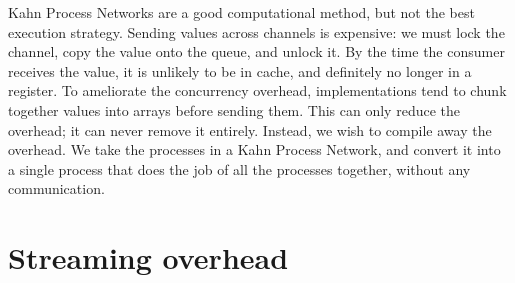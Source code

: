 % 
% 

Kahn Process Networks are a good computational method, but not the best execution strategy.
Sending values across channels is expensive: we must lock the channel, copy the value onto the queue, and unlock it.
By the time the consumer receives the value, it is unlikely to be in cache, and definitely no longer in a register.
To ameliorate the concurrency overhead, implementations tend to chunk together values into arrays before sending them.
This can only reduce the overhead; it can never remove it entirely.
Instead, we wish to compile away the overhead.
We take the processes in a Kahn Process Network, and convert it into a single process that does the job of all the processes together, without any communication.

% 
% 
% 



\section{Streaming overhead}

